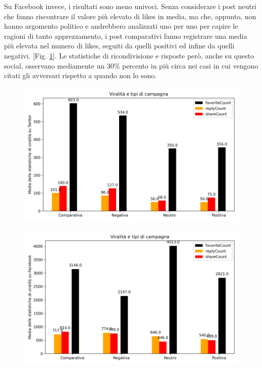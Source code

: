 Su Facebook invece, i risultati sono meno  univoci. Senza considerare i post neutri che fanno riscontrare il valore più elevato di likes in media, ma che, appunto, non hanno argomento politico e andrebbero analizzati uno per uno per capire le ragioni di tanto apprezzamento, i post comparativi fanno registrare una media più elevata nel numero di likes, seguiti da quelli positivi ed infine da quelli negativi.  [Fig. \ref{fig:viralitafb}]. Le statistiche di ricondivisione e risposte però, anche su questo social, osservano mediamente un  30\% percento in più circa nei casi in cui vengono citati gli avversari rispetto a quando non lo sono.
\begin{figure}
	\centering
	\begin{minipage}{.5\textwidth}
		\centering
		\includegraphics[width=\linewidth]{figures/viralitatw}
		\label{fig:viralitatw}
	\end{minipage}%
	\begin{minipage}{.5\textwidth}
		\centering
		\includegraphics[width=\linewidth]{figures/viralitafb}
		\label{fig:viralitafb}
	\end{minipage}
\end{figure}
